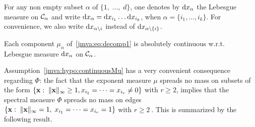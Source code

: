 \bigskip
For any non empty subset $\alpha$ of $\{1,\; \ldots,\;d\}$, one denotes by $\mathrm{d} x_\alpha$ the Lebesgue measure on ${\cal C}_\alpha$ and write $\mathrm{d} x_\alpha  = \mathrm{d} x_{i_1}\ldots\mathrm{d} x_{i_k}$, when $\alpha=\{i_1, \ldots , i_k\}$. For convenience, we also write $\mathrm{d} x_{\alpha\setminus{i}}$ instead of  $\mathrm{d} x_{\alpha\setminus{\{i\}}}$.
\begin{assumption}\label{jmva:hypo:continuousMu}
Each component $\mu_\alpha$ of~\eqref{jmva:eq:decomp1} is absolutely continuous w.r.t.
Lebesgue measure $\mathrm{d} x_\alpha$ on ${\cal C}_\alpha$. %
\end{assumption}
\noindent
Assumption~\ref{jmva:hypo:continuousMu} has a very convenient consequence 
regarding $ \Phi$: the fact that the exponent measure $\mu$ spreads no mass on subsets of the form 
$\{\mathbf x: \;\| {\mathbf x}\|_{\infty} \ge 1, x_{i_1} = \dotsb =  x_{i_r} \neq 0 \}$ with $r \ge 2$,
implies that the spectral measure $\Phi$ spreads no mass on edges $\{\mathbf x: \;\| {\mathbf x}\|_{\infty} = 1,  \; x_{i_1} = \dotsb =  x_{i_r} =1 \}$ with $r \ge 2~.$
This is summarized by the following result.
